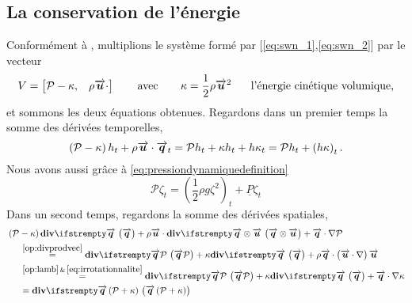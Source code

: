 \subsection{La conservation de l'énergie}
\noindent Conformément à \citet{bosi_spectral_2019}, multiplions le système formé par [\eqref{eq:swn_1},\eqref{eq:swn_2}] par le vecteur
\begin{equation*}
	V = \left[\mathcal{P} -  \kappa,\hspace{3mm} \rho\overrightarrow{\boldsymbol{u}}\cdot\right] \hspace{6mm}\text{ avec }\hspace{6mm} \kappa = \frac{1}{2}\rho \overrightarrow{\boldsymbol{u}}^2\hspace{5mm} \text{ l'énergie cinétique volumique,}
\end{equation*}
et sommons les deux équations obtenues. Regardons dans un premier temps la somme des dérivées temporelles,
\begin{equation*}
	\left(\mathcal{P} - \kappa\right)h_t + \rho\overrightarrow{\boldsymbol{u}}\cdot\overrightarrow{\boldsymbol{q}}_t = \mathcal{P}h_t + \kappa h_t + h\kappa_t = \mathcal{P}h_t  + \left(h\kappa\right)_t.
\end{equation*}
Nous avons aussi grâce à \eqref{eq:pressiondynamiquedefinition}
\begin{equation}
	\mathcal{P}\zeta_t  = \left(\frac{1}{2} \rho g \zeta^2\right)_t + \underline{P}\zeta_t 
\end{equation}
Dans un second temps, regardons la somme des dérivées spatiales,
\begin{align*}
&\left(\mathcal{P} - \kappa\right) \div[\boldvec{q}] + \rho\velocity\cdot \div[\boldvec{q}\otimes\velocity] + \boldvec{q}\cdot \nabla \mathcal{P}\\ &\hspace{5mm}\overset{\eqref{op:divprodvec}}{=} \div[\boldvec{q}\mathcal{P}] + \kappa\div[\boldvec{q}] + \rho\boldvec{q} \cdot \left(\velocity \cdot \nabla \right) \velocity\\
&\hspace{5mm}\overset{\eqref{op:lamb} \,\&\, \eqref{eq:irrotationnalite}}{=} \div[\boldvec{q}\mathcal{P}] + \kappa \div[\boldvec{q}] + \boldvec{q} \cdot \nabla \kappa\\
&\hspace{5mm}= \div[\boldvec{q} \left(\mathcal{P} + \kappa\right)]
\end{align*}
